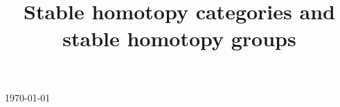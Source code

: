 

\title{Stable homotopy categories and stable homotopy groups}

\usepackage[sort=standard]{glossaries} 
\makeglossaries
\setcounter{tocdepth}{3}



\maketitle
\centerline{\today}
\tableofcontents







